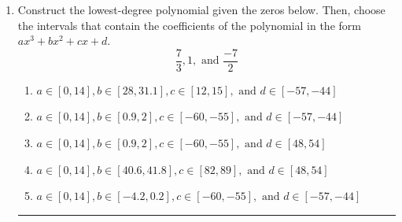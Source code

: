 \documentclass[14pt]{extbook}
\newcommand{\litem}[1]{\item#1\hspace*{-1cm}\rule{\textwidth}{0.4pt}}
\begin{document}
\begin{enumerate}
\litem{
Construct the lowest-degree polynomial given the zeros below. Then, choose the intervals that contain the coefficients of the polynomial in the form $ax^3+bx^2+cx+d$.\[ \frac{7}{3}, 1, \text{ and } \frac{-7}{2} \]\begin{enumerate}[label=\Alph*.]
\item \( a \in [0, 14], b \in [28, 31.1], c \in [12, 15], \text{ and } d \in [-57, -44] \)
\item \( a \in [0, 14], b \in [0.9, 2], c \in [-60, -55], \text{ and } d \in [-57, -44] \)
\item \( a \in [0, 14], b \in [0.9, 2], c \in [-60, -55], \text{ and } d \in [48, 54] \)
\item \( a \in [0, 14], b \in [40.6, 41.8], c \in [82, 89], \text{ and } d \in [48, 54] \)
\item \( a \in [0, 14], b \in [-4.2, 0.2], c \in [-60, -55], \text{ and } d \in [-57, -44] \)


\end{enumerate}}
\end{enumerate}
\end{document}
